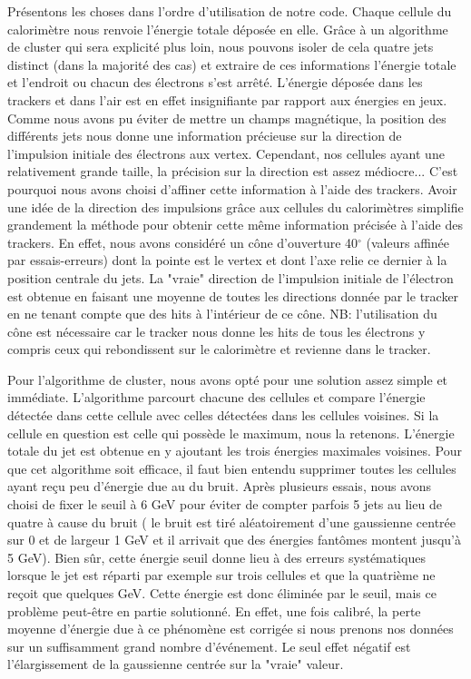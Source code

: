 \documentclass[11pt]{article}
\begin{document}
Présentons les choses dans l'ordre d'utilisation de notre code. Chaque cellule
du calorimètre nous renvoie l'énergie totale déposée en elle. Grâce à un
algorithme de cluster qui sera explicité plus loin, nous pouvons isoler de
cela quatre jets distinct (dans la majorité des cas) et extraire de ces
informations l'énergie totale et l'endroit ou chacun des électrons s'est
arrêté. L'énergie déposée dans les trackers et dans l'air est en effet
insignifiante par rapport aux énergies en jeux. Comme nous avons pu éviter de
mettre un champs magnétique, la position des différents jets nous donne une
information précieuse sur la direction de l'impulsion initiale des électrons aux
vertex. Cependant, nos cellules ayant une relativement grande taille, la
précision sur la direction est assez médiocre... C'est pourquoi nous avons
choisi d'affiner cette information à l'aide des trackers. Avoir une idée de la
direction des impulsions grâce aux cellules du calorimètres simplifie
grandement la méthode pour obtenir cette même information précisée à l'aide des
trackers. En effet, nous avons considéré un cône d'ouverture 40$^{\circ}$
(valeurs affinée par essais-erreurs) dont la pointe est le vertex et dont l'axe
relie ce dernier à la position centrale du jets. La "vraie" direction de
l'impulsion initiale de l'électron est obtenue en faisant une moyenne de toutes
les directions donnée par le tracker en ne tenant compte que des hits à
l'intérieur de ce cône. NB: l'utilisation du cône est nécessaire car le tracker
nous donne les hits de tous les électrons y compris ceux qui rebondissent sur
le calorimètre et revienne dans le tracker. 

Pour l'algorithme de cluster, nous avons opté pour une solution assez simple
et immédiate. L'algorithme parcourt chacune des cellules et compare l'énergie
détectée dans cette cellule avec celles détectées dans les cellules voisines.
Si la cellule en question est celle qui possède le maximum, nous la retenons.
L'énergie totale du jet est obtenue en y ajoutant les trois énergies
maximales voisines. Pour que cet algorithme soit efficace, il faut bien entendu
supprimer toutes les cellules ayant reçu peu d'énergie due au du bruit. Après
plusieurs essais, nous avons choisi de fixer le seuil à 6 GeV pour éviter de
compter parfois 5 jets au lieu de quatre à cause du bruit ( le bruit est tiré
aléatoirement d'une gaussienne centrée sur 0 et de largeur 1 GeV et il arrivait
que des énergies fantômes montent jusqu'à 5 GeV). Bien sûr, cette énergie seuil
donne lieu à des erreurs systématiques lorsque le jet est réparti par exemple
sur trois cellules et que la quatrième ne reçoit que quelques GeV. Cette
énergie est donc éliminée par le seuil, mais ce problème peut-être en partie
solutionné. En effet, une fois calibré, la perte moyenne d'énergie due à ce
phénomène est corrigée si nous prenons nos données sur un suffisamment grand
nombre d'événement. Le seul effet négatif est l'élargissement de la gaussienne
centrée sur la "vraie" valeur. 
\end{document}
